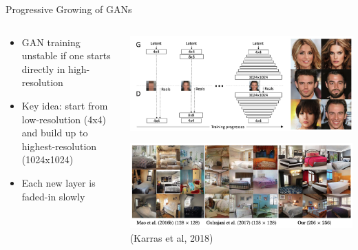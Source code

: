 \documentclass[8pt,xcolor=table,aspectratio=169]{beamer}
\begin{document}
\begin{frame}{Progressive Growing of GANs}
\begin{columns}
\begin{column}{0.5\textwidth}
\begin{itemize}
 \item GAN training unstable if one starts directly in high-resolution
 
 \vspace{2em} 
 
 \item Key idea: start from low-resolution (4x4) and build up to highest-resolution (1024x1024)
 
 \vspace{2em} 
 
 \item Each new layer is faded-in slowly
\end{itemize}
\end{column}
\begin{column}{0.5\textwidth}
\centering
\includegraphics[width=\textwidth]{ZzLPY30.png}

\vspace{2em}

\includegraphics[width=\textwidth]{CP4yMsg.png}
(Karras et al, 2018)
\end{column}
\end{columns}

\end{frame}
\end{document}
